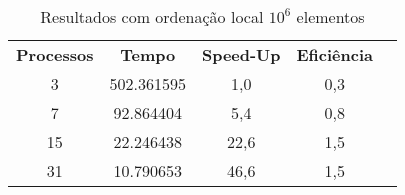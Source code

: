 \begin{table}[h!]
\centering
\caption{Resultados com ordenação local $10^6$ elementos}
\label{table:optimized-1M}
\begin{tabular}{ccccc}
 \textbf{Processos} & \textbf{Tempo} & \textbf{Speed-Up} & \textbf{Eficiência} \\
 3                & 502.361595     & 1,0               & 0,3                 \\
 7                & 92.864404      & 5,4               & 0,8                 \\
 15               & 22.246438      & 22,6              & 1,5                 \\
 31               & 10.790653      & 46,6              & 1,5                 \\
\end{tabular}
\end{table}